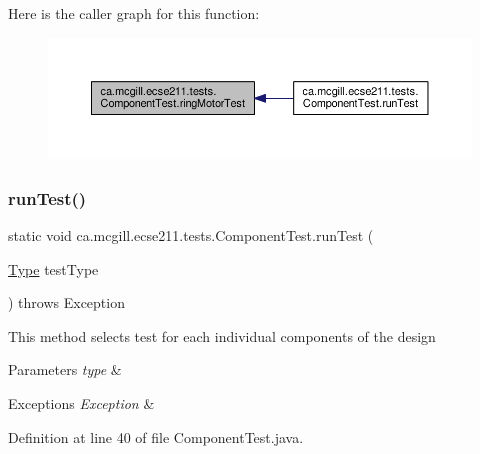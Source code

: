 Here is the caller graph for this function\+:
\nopagebreak
\begin{figure}[H]
\begin{center}
\leavevmode
\includegraphics[width=350pt]{enumca_1_1mcgill_1_1ecse211_1_1tests_1_1_component_test_a1ecca45b47067d825683cf46dcf22b62_icgraph}
\end{center}
\end{figure}
\mbox{\label{enumca_1_1mcgill_1_1ecse211_1_1tests_1_1_component_test_a5dc8bf97bc48adf5bee88d425a1a974e}} 
\subsubsection{\texorpdfstring{run\+Test()}{runTest()}}
{\footnotesize\ttfamily static void ca.\+mcgill.\+ecse211.\+tests.\+Component\+Test.\+run\+Test (\begin{DoxyParamCaption}\item[{\hyperlink{enumca_1_1mcgill_1_1ecse211_1_1tests_1_1_component_test_1_1_type}{Type}}]{test\+Type }\end{DoxyParamCaption}) throws Exception\hspace{0.3cm}{\ttfamily [static]}}

This method selects test for each individual components of the design


\begin{DoxyParams}{Parameters}
{\em type} & \\
\hline
\end{DoxyParams}

\begin{DoxyExceptions}{Exceptions}
{\em Exception} & \\
\hline
\end{DoxyExceptions}


Definition at line 40 of file Component\+Test.\+java.


